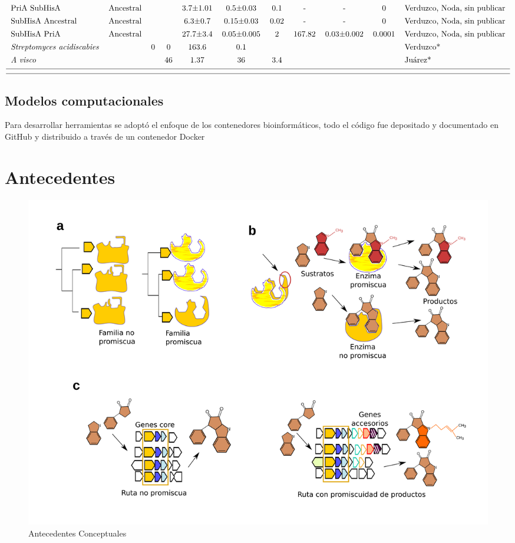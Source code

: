 \documentclass[12pt,twoside]{reedthesis}
\begin{document}
\begin{landscape}
$${\begin{tabular}{ l c r c c c c c c c l}
  PriA SubHisA&Ancestral&&&3.7±1.01&0.5±0.03&0.1&-&-&0&Verduzco, Noda, sin publicar\\ [1ex]    
  SubHisA Ancestral&Ancestral&&&6.3±0.7&0.15±0.03&0.02&-&-&0&Verduzco, Noda, sin publicar\\ [1ex]    
  SubHisA PriA&Ancestral&&&27.7±3.4&0.05±0.005&2&167.82&0.03±0.002&0.0001&Verduzco, Noda, sin publicar\\ [1ex]    
  \textit{Streptomyces} \textit{acidiscabies}&&0&0&163.6&0.1&&&&&Verduzco*\\ [1ex]  
  \textit{A} \textit{visco} &&&46&1.37&36&3.4&&&&Juárez*\\ [1ex]  
  \hline \\ [-1.5ex]
  \hline
  \end{tabular}
  }
  \label{tab:cineticos}  
  $$   
  \end{landscape}
  
  \normalsize
  
  \section{Modelos computacionales}\label{modelos-computacionales}
  
  Para desarrollar herramientas se adoptó el enfoque de los contenedores
  bioinformáticos, todo el código fue depositado y documentado en GitHub y
  distribuido a través de un contenedor Docker
  
  \clearpage  
  
  \chapter*{Antecedentes}\label{antecedentes}
  
  \begin{figure}[h!tbp]
  \centering
  \includegraphics[angle = 0,scale = 0.6]{chapter0/NivelesPromiscuidad.png}
  \caption[Antecedentes Conceptuales]{\normalsize{Antecedentes Conceptuales}}
  \label{fig:La promiscuidad puede entenderse a distintos niveles metabólicos: enzima, familia enzimática y ruta biosintética}
  \end{figure}
  
\end{document}
